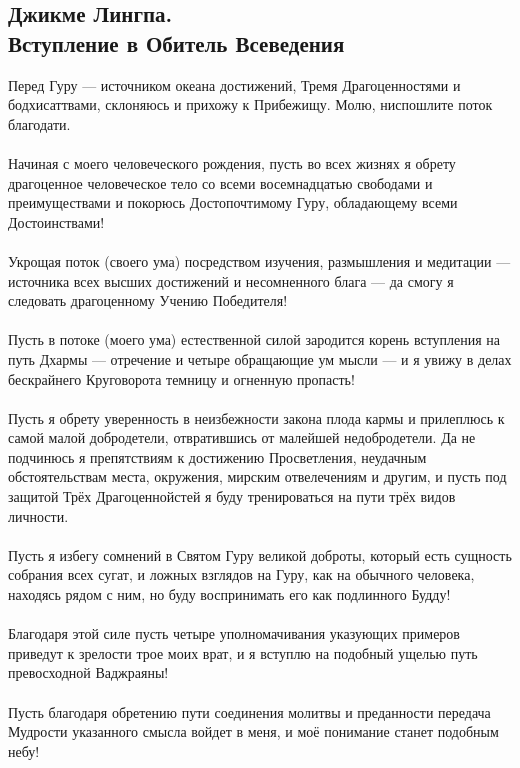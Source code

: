 \newpage
\subsection{Джикме Лингпа.\\Вступление в Обитель Всеведения}

Перед Гуру — источником океана достижений,
Тремя Драгоцен\-ностями и бодхисаттвами,
склоняюсь и прихожу к Прибежищу.
Молю, ниспошлите поток благодати.\\
\\
Начиная с моего человеческого рождения,
пусть во всех жизнях я обрету драгоценное человеческое тело
со всеми восемнадцатью свободами и преимуществами
и покорюсь Дос\-топочтимому Гуру,
обладающему всеми Достоинствами!\\
\\
Укрощая поток (своего ума) посредством изучения,
размышле\-ния и медитации — источника всех
высших достижений и несомненного блага —
да смогу я следовать драгоценному Учению Победителя!\\
\\
Пусть в потоке (моего ума) естественной силой
зародится корень вступления на путь Дхармы —
отречение и четыре обращающие ум мысли —
и я увижу в делах бескрайнего Круго\-ворота
темницу и огненную пропасть!\\
\\
Пусть я обрету уверенность в неизбежности закона плода кармы
и прилеплюсь к самой малой добродетели,
отвратившись от малейшей недобродетели.
Да не подчинюсь я препятствиям к достижению Просветления,
неудачным обстоятельствам места, окружения,
мирским отвелечениям и другим, и пусть под защитой
Трёх Драгоценнойстей я буду тренироваться
на пути трёх видов личности.\\
\\
Пусть я избегу сомнений в Святом Гуру великой доброты,
который есть сущность собрания всех сугат,
и ложных взглядов на Гуру, как на обычного человека,
находясь рядом с ним, но буду воспринимать его как
подлинного Будду!\\
\\
Благодаря этой силе пусть четыре уполномачивания
указующих примеров приведут к зрелости трое моих врат,
и я вступлю на подобный ущелью путь превосходной Ваджраяны!\\
\\
Пусть благодаря обретению пути соединения молитвы и предан\-ности
передача Мудрости указанного смысла войдет в меня,
и моё понимание станет подобным небу!\\
